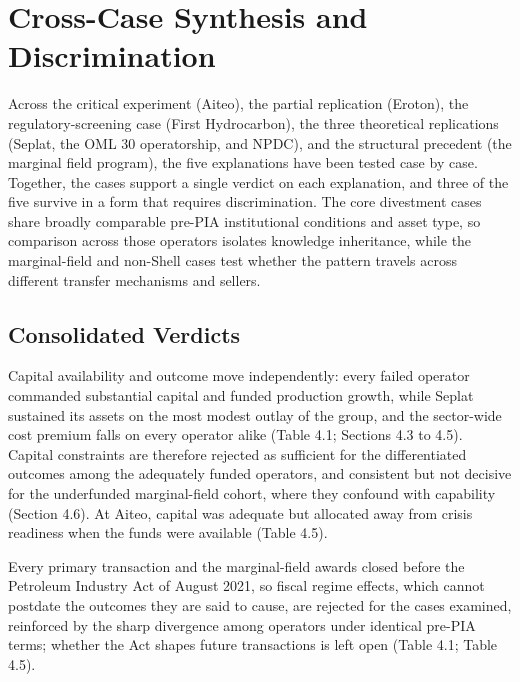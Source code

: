 \documentclass[twoside,fontset=lmodern]{mitthesis}
\begin{document}
\hypertarget{cross-case-synthesis-and-discrimination}{%
\section{Cross-Case Synthesis and
Discrimination}\label{cross-case-synthesis-and-discrimination}}

Across the critical experiment (Aiteo), the partial replication
(Eroton), the regulatory-screening case (First Hydrocarbon), the three
theoretical replications (Seplat, the OML 30 operatorship, and NPDC),
and the structural precedent (the marginal field program), the five
explanations have been tested case by case. Together, the cases support
a single verdict on each explanation, and three of the five survive in a
form that requires discrimination. The core divestment cases share
broadly comparable pre-PIA institutional conditions and asset type, so
comparison across those operators isolates knowledge inheritance, while
the marginal-field and non-Shell cases test whether the pattern travels
across different transfer mechanisms and sellers.

\hypertarget{consolidated-verdicts}{%
\subsection{Consolidated Verdicts}\label{consolidated-verdicts}}

Capital availability and outcome move independently: every failed
operator commanded substantial capital and funded production growth,
while Seplat sustained its assets on the most modest outlay of the
group, and the sector-wide cost premium falls on every operator alike
(Table 4.1; Sections 4.3 to 4.5). Capital constraints are therefore
rejected as sufficient for the differentiated outcomes among the
adequately funded operators, and consistent but not decisive for the
underfunded marginal-field cohort, where they confound with capability
(Section 4.6). At Aiteo, capital was adequate but allocated away from
crisis readiness when the funds were available (Table 4.5).

Every primary transaction and the marginal-field awards closed before
the Petroleum Industry Act of August 2021, so fiscal regime effects,
which cannot postdate the outcomes they are said to cause, are rejected
for the cases examined, reinforced by the sharp divergence among
operators under identical pre-PIA terms; whether the Act shapes future
transactions is left open (Table 4.1; Table 4.5).
\end{document}

